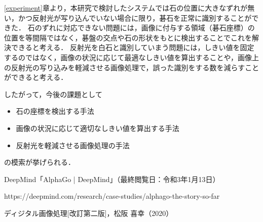 \documentclass[summary]{nitocs}
\numberwithin{equation}{section}
\begin{document}
        \ref{experiment}章より，本研究で検討したシステムでは石の位置に大きなずれが無い，かつ反射光が写り込んでいない場合に限り，碁石を正常に識別することができた．
        石のずれに対応できない問題には，画像に付与する領域（碁石座標）の位置を等間隔ではなく，碁盤の交点や石の形状をもとに検出することでこれを解決できると考える．
        反射光を白石と識別していまう問題には，しきい値を固定するのではなく，画像の状況に応じて最適なしきい値を算出することや，画像上の反射光の写り込みを軽減させる画像処理で，誤った識別をする数を減らすことができると考える．

        したがって，今後の課題として
        \begin{itemize}
            \item 石の座標を検出する手法
            \item 画像の状況に応じて適切なしきい値を算出する手法
            \item 反射光を軽減させる画像処理の手法
        \end{itemize}
        の模索が挙げられる．    

    \begin{thebibliography}{10}
        DeepMind「AlphaGo | DeepMind」（最終閲覧日：令和3年1月13日）
        
        https://deepmind.com/research/case-studies/alphago-the-story-so-far

        ディジタル画像処理[改訂第二版]，松阪 喜幸（2020）
    \end{thebibliography}
\end{document}
